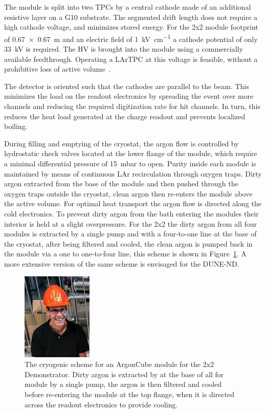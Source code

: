 The module is split into two TPCs by a central cathode made of an additional resistive layer on a G10 substrate. The segmented drift length does not require a high cathode voltage, and minimizes stored energy. For the 2x2 module footprint of \SI{0.67 x 0.67}{\metre} and an electric field of \SI{1}{\kilo\volt\per\centi\metre} a cathode potential of only \SI{33}{\kilo\volt} is required. The HV is brought into the module using a commercially available feedthrough. Operating a LArTPC at this voltage is feasible, without a prohibitive loss of active volume~\cite{argontube}.

The detector is oriented such that the cathodes are parallel to the beam. This minimizes the load on the readout electronics by spreading the event over more channels and reducing the required digitization rate for hit channels. In turn, this reduces the heat load generated at the charge readout and prevents localized boiling.

During filling and emptying of the cryostat, the argon flow is controlled by hydrostatic check valves located at the lower flange of the module, which require a minimal differential pressure of \SI{15}{\milli\bar} to open. Purity inside each module is maintained by means of continuous LAr recirculation through oxygen traps. Dirty argon extracted from the base of the module and then pushed through the oxygen traps outside the cryostat, clean argon then re-enters the module above the active volume. For optimal heat transport the argon flow is directed along the cold electronics. To prevent dirty argon from the bath entering the modules their interior is held at a slight overpressure. For the 2x2 the dirty argon from all four modules is extracted by a single pump and with a four-to-one line at the base of the cryostat, after being filtered and cooled, the clean argon is pumped back in the module via a one to one-to-four line, this scheme is shown in Figure~\ref{fig:cryo_scheme}. A more extensive version of the same scheme is envisaged for the DUNE-ND.  

\begin{figure}[tbp]
	\centering
	\includegraphics[width=0.3\textwidth]{plots/missing_figure}
	\caption[ArgonCube module cryogenic scheme]{The cryogenic scheme for an ArgonCube module for the 2x2 Demonstrator. Dirty argon is extracted by at the base of all for module by a single pump, the argon is then filtered and cooled before re-entering the module at the top flange, when it is directed across the readout electronics to provide cooling.}
	\label{fig:cryo_scheme}
\end{figure}

